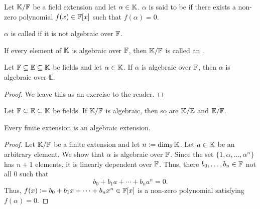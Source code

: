 \begin{defn}
    Let $\mathbb{K}/\mathbb{F}$ be a field extension and let $\alpha \in \mathbb{K}$. $\alpha$ is said to be  if there exists a non-zero polynomial $f(x) \in \mathbb{F}[x]$ such that $f(\alpha) = 0$. 
    
    $\alpha$ is called  if it is not algebraic over $\mathbb{F}$.
    
    If every element of $\mathbb{K}$ is algebraic over $\mathbb{F}$, then $\mathbb{K}/\mathbb{F}$ is called an .
\end{defn}

\begin{prop}
    Let $\mathbb{F} \subseteq \mathbb{E} \subseteq \mathbb{K}$ be fields and let $\alpha \in \mathbb{K}$. If $\alpha$ is algebraic over $\mathbb{F}$, then $\alpha$ is algebraic over $\mathbb{E}$. 
\end{prop}
\begin{proof}
    We leave this as an exercise to the reader.
\end{proof}
\begin{cor}
    Let $\mathbb{F} \subseteq \mathbb{E} \subseteq \mathbb{K}$ be fields. If $\mathbb{K}/\mathbb{F}$ is algebraic, then so are $\mathbb{K}/\mathbb{E}$ and $\mathbb{E}/\mathbb{F}$.
\end{cor}

\begin{prop} \label{prop:finite-is-algebraic}
    Every finite extension is an algebraic extension.
\end{prop}
\begin{proof}
    Let $\mathbb{K}/\mathbb{F}$ be a finite extension and let $n \vcentcolon= \dim_{\mathbb{F}}\mathbb{K}$. Let $a \in \mathbb{K}$ be an arbitrary element. We show that $\alpha$ is algebraic over $\mathbb{F}$. Since the set $\{1, \alpha, \ldots, \alpha^n\}$ has $n+1$ elements, it is linearly dependent over $\mathbb{F}$. Thus, there $b_0, \ldots, b_n \in \mathbb{F}$ not all $0$ such that
    \[
        b_0 + b_1 a + \cdots + b_n a^n = 0.
    \]
    Thus, $f(x) \vcentcolon= b_0 + b_1 x + \cdots + b_n x^n \in \mathbb{F}[x]$ is a non-zero polynomial satisfying $f(\alpha) = 0$.
\end{proof}

